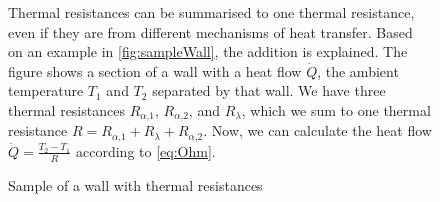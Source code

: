     \begin{figure}[H]
    \begin{minipage}[t]{7cm}
    \vspace{0pt}
    Thermal resistances can be summarised to one thermal resistance, even if they are from different mechanisms of heat transfer. Based on an example in \autoref{fig:sampleWall}, the addition is explained. The figure shows a section of a wall with a heat flow $\dot{Q}$, the ambient temperature $T_\text{1}$ and $T_\text{2}$ separated by that wall. We have three thermal resistances $R_{\alpha\text{,1}}$, $R_{\alpha\text{,2}}$, and $R_\lambda$, which we sum to one thermal resistance $R = R_{\alpha\text{,1}} + R_\lambda + R_{\alpha\text{,2}}$. Now, we can calculate the heat flow $\dot{Q}= \frac{T_\text{2}-T_\text{1}}{R} $ according to \autoref{eq:Ohm}.
    \end{minipage}
    \hfill
    \begin{minipage}[t]{7cm}
    \vspace{0pt}
    \centering
    
    \caption{Sample of a wall with thermal resistances}
    \label{fig:sampleWall}
    \end{minipage}
    \end{figure}
    
